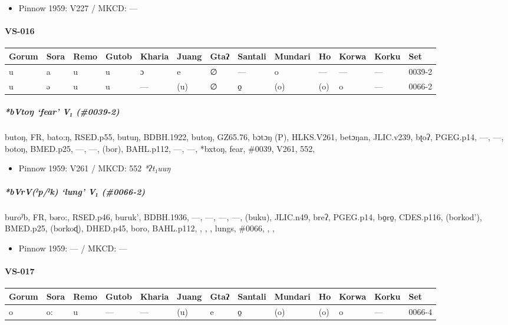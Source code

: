 \documentclass[a4paper,]{article}
\providecommand{\tightlist}{%
  \setlength{\itemsep}{0pt}\setlength{\parskip}{0pt}}
\let\oldparagraph\paragraph
\renewcommand{\paragraph}[1]{\oldparagraph{#1}\mbox{}}
\let\oldsubparagraph\subparagraph
\renewcommand{\subparagraph}[1]{\oldsubparagraph{#1}\mbox{}}
\begin{document}
\begin{itemize}
\tightlist
\item
  Pinnow 1959: V227 / MKCD: ---
\end{itemize}

\paragraph{VS-016}\label{vs-016}

\begin{longtable}[]{@{}lllllllllllll@{}}
\toprule
Gorum & Sora & Remo & Gutob & Kharia & Juang & Gtaʔ & Santali & Mundari
& Ho & Korwa & Korku & Set\tabularnewline
\midrule
\endhead
u & a & u & u & ɔ & e & ∅ & --- & o & --- & --- & --- &
0039-2\tabularnewline
u & ə & u & u & --- & (u) & ∅ & o̠ & (o) & (o) & o & --- &
0066-2\tabularnewline
\bottomrule
\end{longtable}

\subparagraph{\texorpdfstring{\emph{*bVtoŋ} `fear' V₁
(\#0039-2)}{*bVtoŋ fear V₁ (\#0039-2)}}\label{bvtoux14b-fear-v-0039-2}

butoŋ, FR, bato:ŋ, RSED.p55, butuŋ, BDBH.1922, butoŋ, GZ65.76, bɔtɔŋ
(P), HLKS.V261, betɔŋan, JLIC.v239, bʈoʔ, PGEG.p14, ---, ---, botoŋ,
BMED.p25, ---, ---, (bor), BAHL.p112, ---, ---, *bxtoŋ, fear, \#0039,
V261, 552,

\begin{itemize}
\tightlist
\item
  Pinnow 1959: V261 / MKCD: 552 \emph{*ʔt₁uuŋ}
\end{itemize}

\subparagraph{\texorpdfstring{\emph{*bVrV(ˀp/ˀk)} `lung' V₁
(\#0066-2)}{*bVrV(ˀp/ˀk) lung V₁ (\#0066-2)}}\label{bvrvux2c0pux2c0k-lung-v-0066-2}

buroˀb, FR, bəro:, RSED.p46, buruk', BDBH.1936, ---, ---, ---, ---,
(buku), JLIC.n49, breʔ, PGEG.p14, bo̠ro̠, CDES.p116, (borkod'), BMED.p25,
(borkoɖ), DHED.p45, boro, BAHL.p112, , , , lungs, \#0066, , ,

\begin{itemize}
\tightlist
\item
  Pinnow 1959: --- / MKCD: ---
\end{itemize}

\paragraph{VS-017}\label{vs-017}

\begin{longtable}[]{@{}lllllllllllll@{}}
\toprule
Gorum & Sora & Remo & Gutob & Kharia & Juang & Gtaʔ & Santali & Mundari
& Ho & Korwa & Korku & Set\tabularnewline
\midrule
\endhead
o & o: & u & --- & --- & (u) & e & o̠ & (o) & (o) & o & --- &
0066-4\tabularnewline
\bottomrule
\end{longtable}
\end{document}

